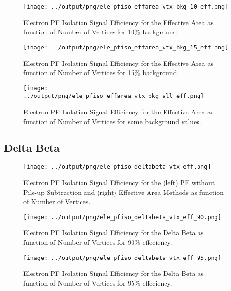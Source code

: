 \documentclass[11pt]{book}
\begin{document}
\begin{figure}[htb]
\centering
\texttt{[image: ../output/png/ele\_pfiso\_effarea\_vtx\_bkg\_10\_eff.png]}
\caption{Electron PF Isolation Signal Efficiency for the Effective Area as function of Number of Vertices for 10\% background.}
\label{fig:ele_pfiso_vtx_eff_effarea_bkg_10_eff}
\end{figure}

\begin{figure}[htb]
\centering
\texttt{[image: ../output/png/ele\_pfiso\_effarea\_vtx\_bkg\_15\_eff.png]}
\caption{Electron PF Isolation Signal Efficiency for the Effective Area as function of Number of Vertices for 15\% background.}
\label{fig:ele_pfiso_vtx_eff_effarea_bkg_15_eff}
\end{figure}

\begin{figure}[htb]
\centering
\texttt{[image: ../output/png/ele\_pfiso\_effarea\_vtx\_bkg\_all\_eff.png]}
\caption{Electron PF Isolation Signal Efficiency for the Effective Area as function of Number of Vertices for some background values.}
\label{fig:ele_pfiso_vtx_eff_effarea_bkg_all_eff}
\end{figure}
\clearpage

\subsection{Delta Beta}
\begin{figure}[htb]
\centering
\texttt{[image: ../output/png/ele\_pfiso\_deltabeta\_vtx\_eff.png]}
\caption{Electron PF Isolation Signal Efficiency for the (left) PF without Pile-up Subtraction and (right) Effective Area Methods as function of Number of Vertices.}
\label{fig:ele_pfiso_vtx_eff_deltabeta}
\end{figure}

\begin{figure}[htb]
\centering
\texttt{[image: ../output/png/ele\_pfiso\_deltabeta\_vtx\_eff\_90.png]}
\caption{Electron PF Isolation Signal Efficiency for the Delta Beta as function of Number of Vertices for 90\% effeciency.}
\label{fig:ele_pfiso_vtx_eff_deltabeta_eff_90}
\end{figure}

\begin{figure}[htb]
\centering
\texttt{[image: ../output/png/ele\_pfiso\_deltabeta\_vtx\_eff\_95.png]}
\caption{Electron PF Isolation Signal Efficiency for the Delta Beta as function of Number of Vertices for 95\% effeciency.}
\label{fig:ele_pfiso_vtx_eff_deltabeta_eff_95}
\end{figure}
\end{document}
